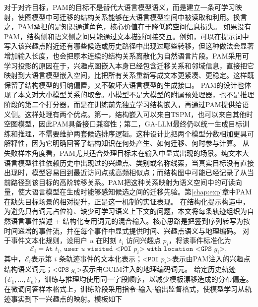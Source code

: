 对于对齐目标，PAM的目标不是替代大语言模型语义，而是建立一条可学习映射，使图模型中可迁移的结构关系能够在大语言模型空间中被读取和利用。换言之，PAM承担的是知识通道角色，核心价值在于降低跨空间信息损失。
如果没有PAM，结构侧和语义侧之间只能通过文本描述间接交互。例如，可以在提示词中写入该兴趣点附近还有哪些候选或历史路径中出现过哪些转移，但这种做法会显著增加输入长度，也会把原本连续的结构关系离散化为自然语言片段。PAM采用可学习投影的原因在于，兴趣点图嵌入本身已经包含迁移关系和邻域信息，直接把它映射到大语言模型嵌入空间，比把所有关系重新写成文本更紧凑、更稳定。这样既保留了结构模型的归纳偏置，又不破坏大语言模型的生成接口。
PAM的设计也体现了本文对大小模型关系的取舍。小模型不是大模型的附属预处理器，也不是推理阶段的第二个打分器，而是在训练前先独立学习结构嵌入，再通过PAM提供给语义侧。这样处理有两个优点。第一，结构嵌入可以来自TSPM，也可以来自其他时空图模型，因此PAM具备接口兼容性；第二，GA-LLM最终仍以统一生成目标训练和推理，不需要维护两套候选排序逻辑。这种设计比把两个模型分数相加更具可解释性，因为它明确回答了结构知识在何处产生、如何迁移、何时参与计算。
从失败样本角度看，PAM尤其适合处理目标未在输入中显式出现的场景。纯文本大语言模型往往依赖历史中出现过的兴趣点、类别或名称线索，当真实目标没有直接出现时，模型容易回到最近访问点或高频相似点；而结构图中可能已经记录了从当前路径到该目标的高阶转移关系。PAM把这种关系映射为语义空间中的可读向量，使大语言模型在生成时能够感知候选之间的迁移先验。第\ref{chap:exp}章中PAM在缺失目标场景的相对提升，正是这一机制的实证表现。
在结构化提示构造中，为避免只有词元占位符、缺少可学习语义上下文的问题，本文将每条轨迹组织为自然语言事件描述 + 结构化专用词元的混合输入。核心思路是把签到序列转写为按时间递增的事件流，并在每个事件中显式提供时间、兴趣点语义与地理编码。
对于事件文本化规则，设用户 $u$ 在时刻 $t_i$ 访问兴趣点 $p_i$，将该事件标准化为
\begin{equation}
\mathcal{E}_i=\texttt{At }t_i\texttt{, user }u\texttt{ visited }\texttt{<POI }p_i\texttt{> with location }\texttt{<GPS }g_i\texttt{>},
\label{eq:c3-event-text}
\end{equation}
其中，$\mathcal{E}_i$表示第 $i$ 条轨迹事件的文本化表示；$\texttt{<POI }p_i\texttt{>}$表示由PAM注入的兴趣点结构语义词元；$\texttt{<GPS }g_i\texttt{>}$表示由GCIM注入的地理编码词元。
给定历史轨迹 $\{\mathcal{E}_1,\ldots,\mathcal{E}_n\}$，训练与推理均使用同一字段顺序，以减少模板漂移造成的分布偏差。
在微调问答样本格式上，训练阶段采用指令-输入-输出监督格式，使模型学习从轨迹事实到下一兴趣点的映射。模板如下
